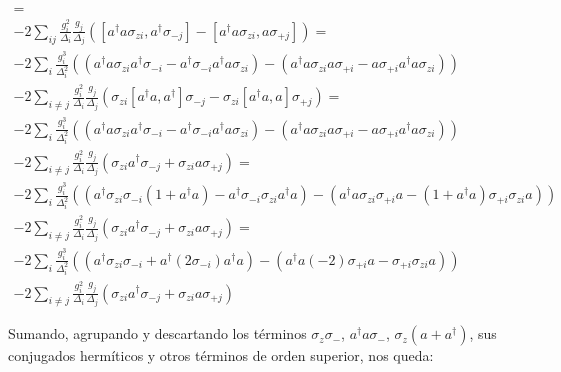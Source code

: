 \begin{multline}
[- 2 \sum\limits_{i} \frac{g_i^2}{\Delta_i} a^\dagger a \sigma_{zi}, \sum\limits_j \frac{g_j} {\Delta_j} (a^\dagger \sigma_{-j} - a \sigma_{+j})] = \\
- 2 \sum\limits_{ij} \frac{g_i^2}{\Delta_i} \frac{g_j}{\Delta_j} \left(
[a^\dagger a \sigma_{zi}, a^\dagger \sigma_{-j}] -
[a^\dagger a \sigma_{zi}, a \sigma_{+j}]
\right) = \\
- 2 \sum\limits_{i} \frac{g_i^3}{\Delta_i^2} \left(
(a^\dagger a \sigma_{zi} a^\dagger \sigma_{-i} - a^\dagger \sigma_{-i} a^\dagger a \sigma_{zi}) -
(a^\dagger a \sigma_{zi} a \sigma_{+i} - a \sigma_{+i} a^\dagger a \sigma_{zi})
\right) \\
- 2 \sum\limits_{i \neq j} \frac{g_i^2}{\Delta_i} \frac{g_j}{\Delta_j} \left(
\sigma_{zi} [a^\dagger a, a^\dagger] \sigma_{-j} -
\sigma_{zi} [a^\dagger a, a] \sigma_{+j}
\right) = \\
- 2 \sum\limits_{i} \frac{g_i^3}{\Delta_i^2} \left(
(a^\dagger a \sigma_{zi} a^\dagger \sigma_{-i} - a^\dagger \sigma_{-i} a^\dagger a \sigma_{zi}) -
(a^\dagger a \sigma_{zi} a \sigma_{+i} - a \sigma_{+i} a^\dagger a \sigma_{zi})
\right) \\
- 2 \sum\limits_{i \neq j} \frac{g_i^2}{\Delta_i} \frac{g_j}{\Delta_j} \left(
\sigma_{zi} a^\dagger \sigma_{-j} +
\sigma_{zi} a \sigma_{+j}
\right) = \\
- 2 \sum\limits_{i} \frac{g_i^3}{\Delta_i^2} \left(
(a^\dagger \sigma_{zi} \sigma_{-i} (1 + a^\dagger a) - a^\dagger \sigma_{-i} \sigma_{zi} a^\dagger a) -
(a^\dagger a \sigma_{zi} \sigma_{+i} a - (1 + a^\dagger a) \sigma_{+i} \sigma_{zi} a)
\right) \\
- 2 \sum\limits_{i \neq j} \frac{g_i^2}{\Delta_i} \frac{g_j}{\Delta_j} \left(
\sigma_{zi} a^\dagger \sigma_{-j} +
\sigma_{zi} a \sigma_{+j}
\right) = \\
- 2 \sum\limits_{i} \frac{g_i^3}{\Delta_i^2} \left(
(a^\dagger \sigma_{zi} \sigma_{-i} + a^\dagger (2 \sigma_{-i}) a^\dagger a) -
(a^\dagger a (-2) \sigma_{+i} a - \sigma_{+i} \sigma_{zi} a)
\right) \\
- 2 \sum\limits_{i \neq j} \frac{g_i^2}{\Delta_i} \frac{g_j}{\Delta_j} \left(
\sigma_{zi} a^\dagger \sigma_{-j} +
\sigma_{zi} a \sigma_{+j}
\right)
\end{multline}

Sumando, agrupando y descartando los términos $\sigma_z \sigma_-$, $a^\dagger a \sigma_-$, $\sigma_z (a + a^\dagger)$, sus conjugados hermíticos y otros términos de orden superior, nos queda:

